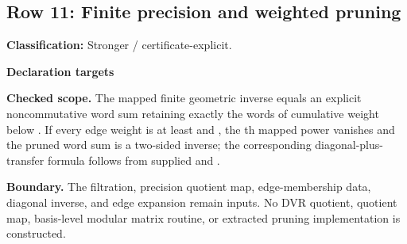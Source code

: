 \subsection{Row 11: Finite precision and weighted pruning}
\label{row:11}
\textbf{Classification:} Stronger / certificate-explicit.
\par\smallskip\textbf{Declaration targets}\par
{\small\noindent{}\par}
{\small\noindent{}\par}
{\small\noindent{}\par}
{\small\noindent{}\par}
{\small\noindent{}\par}
{\small\noindent{}\par}
{\small\noindent{}\par}
{\small\noindent{}\par}
{\small\noindent{}\par}
{\small\noindent{}\par}
{\small\noindent{}\par}
\smallskip\textbf{Checked scope.} The mapped finite geometric inverse equals an explicit noncommutative word sum retaining exactly the words of cumulative weight below . If every edge weight is at least  and , the th mapped power vanishes and the pruned word sum is a two-sided inverse; the corresponding diagonal-plus-transfer formula follows from supplied  and .
\par\smallskip\textbf{Boundary.} The filtration, precision quotient map, edge-membership data, diagonal inverse, and edge expansion remain inputs. No DVR quotient, quotient map, basis-level modular matrix routine, or extracted pruning implementation is constructed.
\medskip
{}
